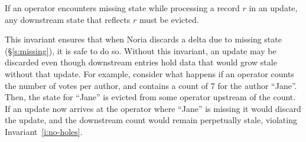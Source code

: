 
%
%
%

\clearpage

\begin{invariant}
  \label{i:missing-suffix}
  If an operator encounters missing state while processing a record $r$ in an
  update, any downstream state that reflects $r$ must be evicted.
\end{invariant}

This invariant ensures that when Noria discards a delta due to missing state
(\S\ref{s:missing}), it is safe to do so. Without this invariant, an update may
be discarded even though downstream entries hold data that would grow stale
without that update. For example, consider what happens if an operator counts
the number of votes per author, and contains a count of 7 for the author
``Jane''. Then, the state for ``Jane'' is evicted from some operator upstream of
the count. If an update now arrives at the operator where ``Jane'' is missing it
would discard the update, and the downstream count would remain perpetually
stale, violating Invariant~\ref{i:no-holes}.

